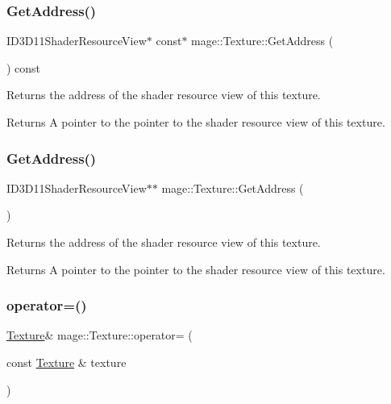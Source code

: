 \subsubsection{\texorpdfstring{Get\+Address()}{GetAddress()}\hspace{0.1cm}{\footnotesize\ttfamily [1/2]}}
{\footnotesize\ttfamily I\+D3\+D11\+Shader\+Resource\+View$\ast$ const$\ast$ mage\+::\+Texture\+::\+Get\+Address (\begin{DoxyParamCaption}{ }\end{DoxyParamCaption}) const}

Returns the address of the shader resource view of this texture.

\begin{DoxyReturn}{Returns}
A pointer to the pointer to the shader resource view of this texture. 
\end{DoxyReturn}
\hypertarget{classmage_1_1_texture_ac6f3b08183e4b35972eb5532b2754643}{}\label{classmage_1_1_texture_ac6f3b08183e4b35972eb5532b2754643} 
\subsubsection{\texorpdfstring{Get\+Address()}{GetAddress()}\hspace{0.1cm}{\footnotesize\ttfamily [2/2]}}
{\footnotesize\ttfamily I\+D3\+D11\+Shader\+Resource\+View$\ast$$\ast$ mage\+::\+Texture\+::\+Get\+Address (\begin{DoxyParamCaption}{ }\end{DoxyParamCaption})}

Returns the address of the shader resource view of this texture.

\begin{DoxyReturn}{Returns}
A pointer to the pointer to the shader resource view of this texture. 
\end{DoxyReturn}
\hypertarget{classmage_1_1_texture_a0b73b4df98d729c8f60e58b0ca065636}{}\label{classmage_1_1_texture_a0b73b4df98d729c8f60e58b0ca065636} 
\subsubsection{\texorpdfstring{operator=()}{operator=()}\hspace{0.1cm}{\footnotesize\ttfamily [1/2]}}
{\footnotesize\ttfamily \hyperlink{classmage_1_1_texture}{Texture}\& mage\+::\+Texture\+::operator= (\begin{DoxyParamCaption}\item[{const \hyperlink{classmage_1_1_texture}{Texture} \&}]{texture }\end{DoxyParamCaption})\hspace{0.3cm}{\ttfamily [delete]}}

